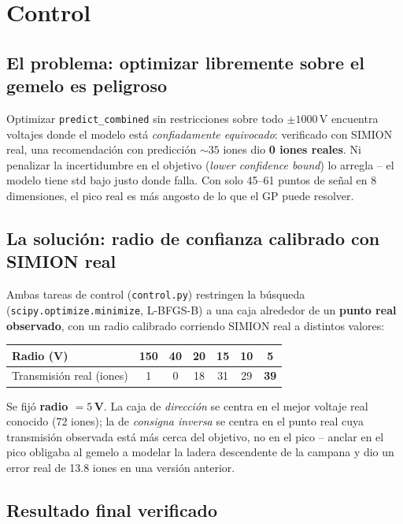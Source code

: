 \documentclass[11pt]{article}
\begin{document}
\section{Control}

\subsection{El problema: optimizar libremente sobre el gemelo es peligroso}

Optimizar \texttt{predict\_combined} sin restricciones sobre todo
$\pm1000\,$V encuentra voltajes donde el modelo está \emph{confiadamente
equivocado}: verificado con SIMION real, una recomendación con predicción
${\sim}35$ iones dio \textbf{0 iones reales}. Ni penalizar la incertidumbre
en el objetivo (\emph{lower confidence bound}) lo arregla -- el modelo tiene
std bajo justo donde falla. Con solo 45--61 puntos de señal en 8 dimensiones,
el pico real es más angosto de lo que el GP puede resolver.

\subsection{La solución: radio de confianza calibrado con SIMION real}

Ambas tareas de control (\texttt{control.py}) restringen la búsqueda
(\texttt{scipy.optimize.minimize}, L-BFGS-B) a una caja alrededor de un
\textbf{punto real observado}, con un radio calibrado corriendo SIMION real a
distintos valores:

\begin{center}
\begin{tabular}{lcccccc}
\toprule
Radio (V) & 150 & 40 & 20 & 15 & 10 & 5 \\
\midrule
Transmisión real (iones) & 1 & 0 & 18 & 31 & 29 & \textbf{39} \\
\bottomrule
\end{tabular}
\end{center}

Se fijó \textbf{radio $=5\,$V}. La caja de \emph{dirección} se centra en el
mejor voltaje real conocido (72 iones); la de \emph{consigna inversa} se
centra en el punto real cuya transmisión observada está más cerca del
objetivo, no en el pico -- anclar en el pico obligaba al gemelo a modelar la
ladera descendente de la campana y dio un error real de 13.8 iones en una
versión anterior.

\subsection{Resultado final verificado}
\end{document}
